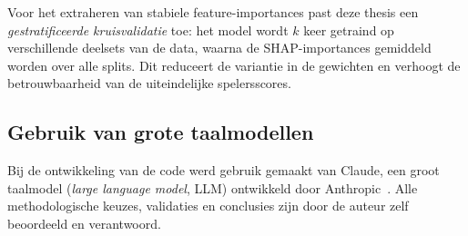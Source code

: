 Voor het extraheren van stabiele feature-importances past deze thesis een \textit{gestratificeerde kruisvalidatie} toe: het model wordt $k$ keer getraind op verschillende deelsets van de data, waarna de SHAP-importances gemiddeld worden over alle splits. Dit reduceert de variantie in de gewichten en verhoogt de betrouwbaarheid van de uiteindelijke spelersscores.
 
\subsection{Gebruik van grote taalmodellen}
 
Bij de ontwikkeling van de code werd gebruik gemaakt van Claude, een groot taalmodel (\textit{large language model}, LLM) ontwikkeld door Anthropic~\autocite{anthropic-claude-2025}. Alle methodologische keuzes, validaties en conclusies zijn door de auteur zelf beoordeeld en verantwoord.
